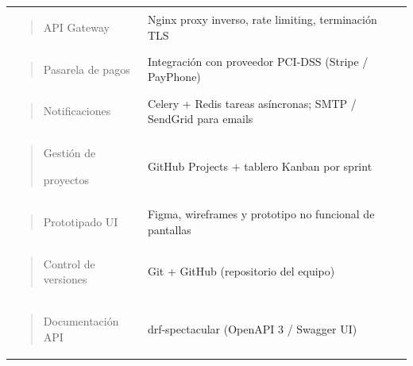 \documentclass[
]{article}
\begin{document}
{\begin{longtable}[]{@{}
  >{\raggedright\arraybackslash}p{}
  >{\raggedright\arraybackslash}p{}@{}}
\begin{minipage}[t]{\linewidth}\raggedright
\begin{quote}
API Gateway
\end{quote}
\end{minipage} & Nginx proxy inverso, rate limiting, terminación TLS \\
\begin{minipage}[t]{\linewidth}\raggedright
\begin{quote}
Pasarela de pagos
\end{quote}
\end{minipage} & Integración con proveedor PCI-DSS (Stripe /
PayPhone) \\
\begin{minipage}[t]{\linewidth}\raggedright
\begin{quote}
Notificaciones
\end{quote}
\end{minipage} & Celery + Redis tareas asíncronas; SMTP / SendGrid para
emails \\
\begin{minipage}[t]{\linewidth}\raggedright
\begin{quote}
Gestión de

proyectos
\end{quote}
\end{minipage} & GitHub Projects + tablero Kanban por sprint \\
\begin{minipage}[t]{\linewidth}\raggedright
\begin{quote}
Prototipado UI
\end{quote}
\end{minipage} & Figma, wireframes y prototipo no funcional de
pantallas \\
\begin{minipage}[t]{\linewidth}\raggedright
\begin{quote}
Control de versiones
\end{quote}
\end{minipage} & Git + GitHub (repositorio del equipo) \\
\begin{minipage}[t]{\linewidth}\raggedright
\begin{quote}
Documentación API
\end{quote}
\end{minipage} & drf-spectacular (OpenAPI 3 / Swagger UI) \\
\end{longtable}
}
\end{document}
